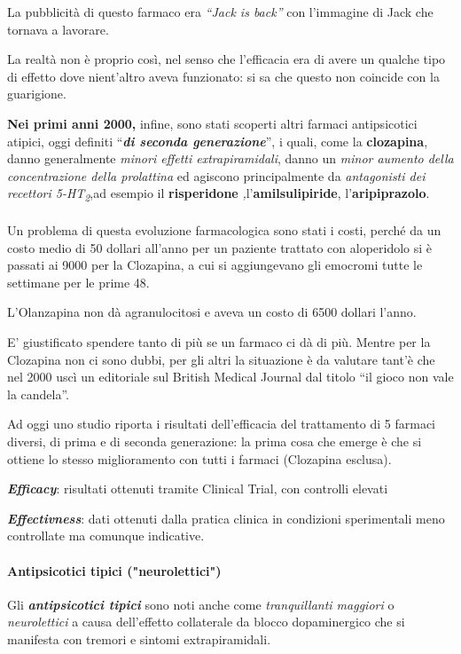 La pubblicità di questo farmaco era \emph{``Jack is back''} con
l'immagine di Jack che tornava a lavorare.

La realtà non è proprio così, nel senso che l'efficacia era di avere un
qualche tipo di effetto dove nient'altro aveva funzionato: si sa che
questo non coincide con la guarigione.

\textbf{Nei primi anni 2000,} infine, sono stati scoperti altri farmaci
antipsicotici atipici, oggi definiti ``\textbf{\emph{di seconda
generazione}}'', i quali, come la \textbf{clozapina}, danno generalmente
\emph{minori effetti extrapiramidali}, danno un \emph{minor aumento
della concentrazione della prolattina} ed agiscono principalmente da
\emph{antagonisti dei recettori 5-HT\textsubscript{2}},ad esempio il
\textbf{risperidone} \emph{,}l'\textbf{amilsulipiride},
l'\textbf{aripiprazolo}.
\\\\
Un problema di questa evoluzione farmacologica sono stati i costi,
perché da un costo medio di 50 dollari all'anno per un paziente trattato
con aloperidolo si è passati ai 9000 per la Clozapina, a cui si
aggiungevano gli emocromi tutte le settimane per le prime 48.

L'Olanzapina non dà agranulocitosi e aveva un costo di 6500 dollari
l'anno.

E' giustificato spendere tanto di più se un farmaco ci dà di più. Mentre
per la Clozapina non ci sono dubbi, per gli altri la situazione è da
valutare tant'è che nel 2000 uscì un editoriale sul British Medical
Journal dal titolo ``il gioco non vale la candela''.

Ad oggi uno studio riporta i risultati dell'efficacia del trattamento di
5 farmaci diversi, di prima e di seconda generazione: la prima cosa che
emerge è che si ottiene lo stesso miglioramento con tutti i farmaci
(Clozapina esclusa).

\emph{\textbf{Efficacy}}: risultati ottenuti tramite Clinical Trial, con
controlli elevati

\emph{\textbf{Effectivness}}: dati ottenuti dalla pratica clinica in
condizioni sperimentali meno controllate ma comunque indicative.

\paragraph{Antipsicotici tipici ("neurolettici")}

Gli \textbf{\emph{antipsicotici tipici}} sono noti anche come
\emph{tranquillanti maggiori} o \emph{neurolettici} a causa dell'effetto
collaterale da blocco dopaminergico che si manifesta con tremori e
sintomi extrapiramidali.

